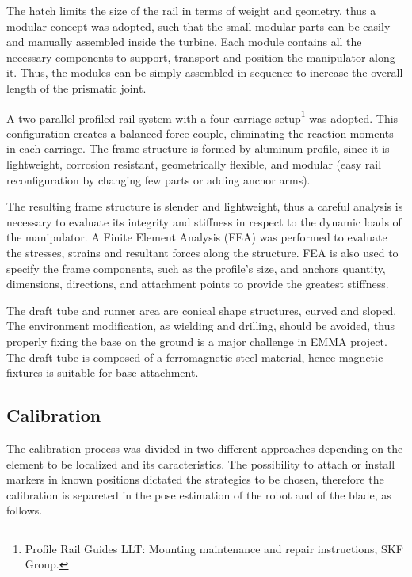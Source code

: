 The hatch limits the size of the rail in terms of weight
and geometry, thus a modular concept was adopted, such that the small modular
parts can be easily and manually assembled inside the turbine. Each module
contains all the necessary components to support, transport and position the
manipulator along it. Thus, the modules can be simply assembled in
sequence to increase the overall length of the prismatic joint.

A two parallel profiled rail system with a four carriage
setup\footnote{Profile Rail Guides LLT: Mounting maintenance and repair
instructions, SKF Group.} was adopted. %
This configuration creates a balanced force couple, eliminating the reaction
moments in each carriage. The frame structure is formed by aluminum
profile, since it is lightweight, corrosion resistant, geometrically flexible,
and modular (easy rail reconfiguration by changing few parts or adding anchor
arms).

The resulting frame structure is slender and lightweight, thus a careful
analysis is necessary to evaluate its integrity and stiffness in
respect to the dynamic loads of the manipulator. A Finite Element Analysis
(FEA) was performed to evaluate the stresses, strains and resultant forces
along the structure. FEA is also used to specify the frame components, such as
the profile's size, and anchors quantity, dimensions, directions, and
attachment points to provide the greatest stiffness.

The draft tube and runner area are conical shape structures, curved and
sloped. The environment modification, as wielding and drilling, should be
avoided, thus properly fixing the base on the ground is a major challenge in
EMMA project. The draft tube is composed of a ferromagnetic steel material,
hence magnetic fixtures is suitable for base attachment. 

\subsection{Calibration}
 
The calibration process was divided in two different approaches depending on the
element to be localized and its caracteristics. The possibility to attach or
install markers in known positions dictated the strategies to be chosen,
therefore the calibration is separeted in the pose estimation of the robot and
of the blade, as follows.
   
